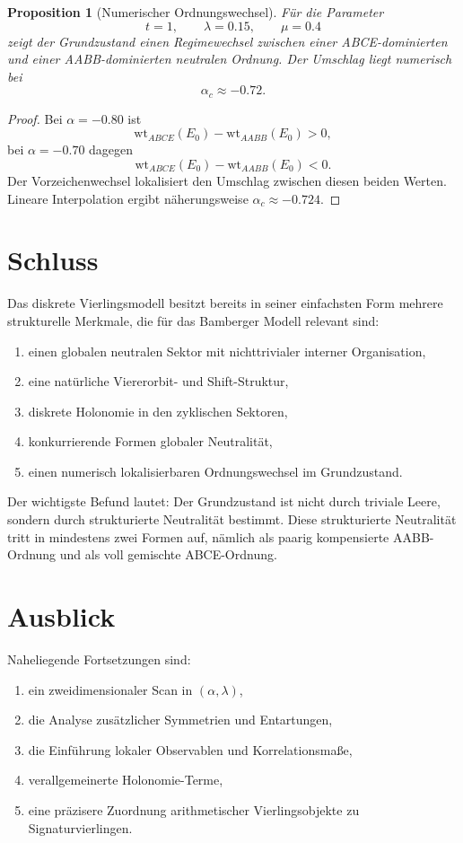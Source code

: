 \documentclass[11pt,a4paper]{article}
\newtheorem{proposition}[definition]{Proposition}
\newcommand{\wt}{\mathrm{wt}}
\begin{document}
	\begin{proposition}[Numerischer Ordnungswechsel]
		Für die Parameter
		\[
		t=1,\qquad \lambda=0.15,\qquad \mu=0.4
		\]
		zeigt der Grundzustand einen Regimewechsel zwischen einer ABCE-dominierten und einer AABB-dominierten neutralen Ordnung. Der Umschlag liegt numerisch bei
		\[
		\alpha_c\approx -0.72.
		\]
	\end{proposition}
	
	\begin{proof}
		Bei \(\alpha=-0.80\) ist
		\[
		\wt_{ABCE}(E_0)-\wt_{AABB}(E_0)>0,
		\]
		bei \(\alpha=-0.70\) dagegen
		\[
		\wt_{ABCE}(E_0)-\wt_{AABB}(E_0)<0.
		\]
		Der Vorzeichenwechsel lokalisiert den Umschlag zwischen diesen beiden Werten. Lineare Interpolation ergibt näherungsweise \(\alpha_c\approx -0.724\).
	\end{proof}
	
	\section{Schluss}
	
	Das diskrete Vierlingsmodell besitzt bereits in seiner einfachsten Form mehrere strukturelle Merkmale, die für das Bamberger Modell relevant sind:
	
	\begin{enumerate}[label=(\roman*)]
		\item einen globalen neutralen Sektor mit nichttrivialer interner Organisation,
		\item eine natürliche Viererorbit- und Shift-Struktur,
		\item diskrete Holonomie in den zyklischen Sektoren,
		\item konkurrierende Formen globaler Neutralität,
		\item einen numerisch lokalisierbaren Ordnungswechsel im Grundzustand.
	\end{enumerate}
	
	Der wichtigste Befund lautet: Der Grundzustand ist nicht durch triviale Leere, sondern durch strukturierte Neutralität bestimmt. Diese strukturierte Neutralität tritt in mindestens zwei Formen auf, nämlich als paarig kompensierte AABB-Ordnung und als voll gemischte ABCE-Ordnung.
	
	\section*{Ausblick}
	
	Naheliegende Fortsetzungen sind:
	\begin{enumerate}[label=(\arabic*)]
		\item ein zweidimensionaler Scan in \((\alpha,\lambda)\),
		\item die Analyse zusätzlicher Symmetrien und Entartungen,
		\item die Einführung lokaler Observablen und Korrelationsmaße,
		\item verallgemeinerte Holonomie-Terme,
		\item eine präzisere Zuordnung arithmetischer Vierlingsobjekte zu Signaturvierlingen.
	\end{enumerate}
	
\end{document}

